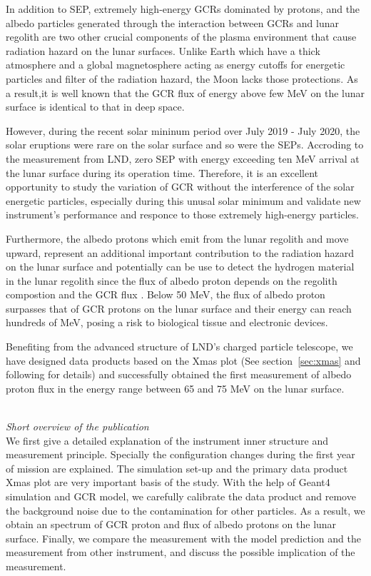 
In addition to \acs{SEP}, extremely high-energy \acp{GCR} dominated by protons, and the albedo particles generated through the interaction between \acp{GCR} and lunar regolith are two other crucial components of the plasma environment that cause radiation hazard on the lunar surfaces.
Unlike Earth which have a thick atmosphere and a global magnetosphere acting as energy cutoffs for energetic particles and filter of the radiation hazard, the Moon lacks those protections. As a result,it is well known that the \ac{GCR} flux of energy above few MeV on the lunar surface is identical to that in deep space.


However, during the recent solar mininum period over July 2019 - July 2020, the solar eruptions were rare on the solar surface and so were the \acp{SEP}. Accroding to the measurement from \ac{LND}, zero \ac{SEP} with energy exceeding ten MeV arrival at the lunar surface during its operation time.
Therefore, it is an excellent opportunity to study the variation of \acs{GCR} without the interference of the solar energetic particles, especially during this unusal solar minimum \citep{Strauss2023ApJ, Fu2021ApJS} and validate new instrument's performance and responce to those extremely high-energy particles.    

Furthermore, the albedo protons which emit from the lunar regolith and move upward, represent an additional important contribution to the radiation hazard on the lunar surface and potentially can be use to detect the hydrogen material in the lunar regolith since the flux of albedo proton depends on the regolith compostion and the \ac{GCR} flux \citep{Schwadron2016Icarus}.
Below 50 MeV, the flux of albedo proton surpasses that of GCR protons on the lunar surface \citep{Dobynde2021JGRE, Wimmer2020SSRv} and their energy can reach hundreds of MeV, posing a risk to biological tissue and electronic devices.

Benefiting from the advanced structure of \ac{LND}'s charged particle telescope, we have designed data products based on the Xmas plot (See section~\ref{sec:xmas} and following for details) and successfully obtained the first measurement of albedo proton flux in the energy range between 65 and 75 MeV on the lunar surface.

\\


\textit{Short overview of the publication}\\

We first give a detailed explanation of the instrument inner structure and measurement principle. Specially the configuration changes during the first year of mission are explained. The simulation set-up and the primary data product Xmas plot are very important basis of the study.
With the help of \ac{Geant4} simulation and \ac{GCR} model, we carefully calibrate the data product and remove the background noise due to the contamination for other particles. As a result, we obtain an spectrum of \ac{GCR} proton and flux of albedo protons on the lunar surface. Finally, we compare the measurement with the model prediction and the measurement from other instrument, and discuss the possible implication of the measurement.


